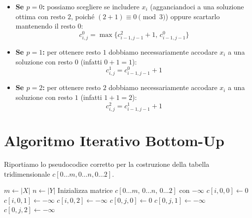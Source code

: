 \begin{itemize}
\item \textbf{Se $p = 0$:} possiamo scegliere se includere $x_i$ (agganciandoci a una soluzione ottima con resto $2$, poiché $(2 + 1) \equiv 0 \pmod 3$) oppure scartarlo mantenendo il resto $0$:
$$c_{i,j}^0 = \max \{ c_{i-1,j-1}^2 + 1, \, c_{i-1,j-1}^0 \}$$
\item \textbf{Se $p = 1$:} per ottenere resto $1$ dobbiamo necessariamente accodare $x_i$ a una soluzione con resto $0$ (infatti $0 + 1 = 1$):
$$c_{i,j}^1 = c_{i-1,j-1}^0 + 1$$
\item \textbf{Se $p = 2$:} per ottenere resto $2$ dobbiamo necessariamente accodare $x_i$ a una soluzione con resto $1$ (infatti $1 + 1 = 2$):
$$c_{i,j}^2 = c_{i-1,j-1}^1 + 1$$
\end{itemize}\section{Algoritmo Iterativo Bottom-Up}Riportiamo lo pseudocodice corretto per la costruzione della tabella tridimensionale $c[0\dots m, 0\dots n, 0\dots 2]$.\begin{algorithm}[H]
\caption{Calcolo Bottom-Up per LCS con rossi multipli di 3}
\begin{algorithmic}[1]
\State $m \gets \vert{}X\vert{}$
\State $n \gets \vert{}Y\vert{}$
\State Inizializza matrice $c[0 \dots m, \, 0 \dots n, \, 0 \dots 2]$ con $-\infty$
    \State $c[i, 0, 0] \gets 0$
    \State $c[i, 0, 1] \gets -\infty$
    \State $c[i, 0, 2] \gets -\infty$
\EndFor
{}
    \State $c[0, j, 0] \gets 0$
    \State $c[0, j, 1] \gets -\infty$
    \State $c[0, j, 2] \gets -\infty$
\EndFor


\end{algorithmic}
\end{algorithm}
